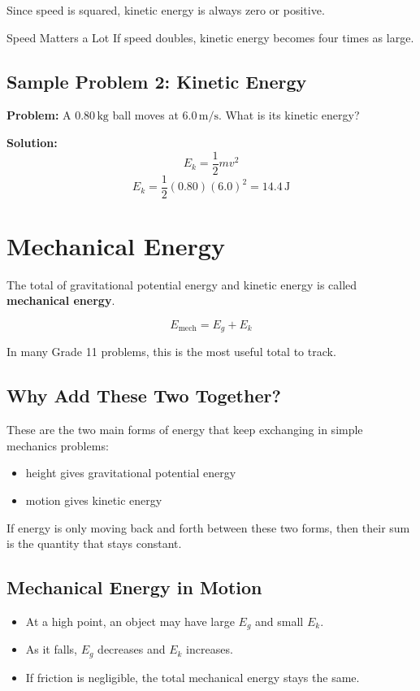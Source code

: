 Since speed is squared, kinetic energy is always zero or positive.

\begin{keyidea}{Speed Matters a Lot}
If speed doubles, kinetic energy becomes four times as large.
\end{keyidea}

\subsection*{Sample Problem 2: Kinetic Energy}
\textbf{Problem:} A $0.80\,\text{kg}$ ball moves at $6.0\,\text{m/s}$. What is its kinetic energy?

\textbf{Solution:}
\begin{equation*}
    E_k = \frac{1}{2}mv^2
\end{equation*}
\begin{equation*}
    E_k = \frac{1}{2}(0.80)(6.0)^2 = 14.4\,\text{J}
\end{equation*}

\section{Mechanical Energy}
The total of gravitational potential energy and kinetic energy is called \textbf{mechanical energy}.

\begin{equation}
    E_{\text{mech}} = E_g + E_k
\end{equation}

In many Grade 11 problems, this is the most useful total to track.

\subsection{Why Add These Two Together?}
These are the two main forms of energy that keep exchanging in simple mechanics problems:
\begin{itemize}
    \item height gives gravitational potential energy
    \item motion gives kinetic energy
\end{itemize}

If energy is only moving back and forth between these two forms, then their sum is the quantity that stays constant.

\subsection{Mechanical Energy in Motion}
\begin{itemize}
    \item At a high point, an object may have large $E_g$ and small $E_k$.
    \item As it falls, $E_g$ decreases and $E_k$ increases.
    \item If friction is negligible, the total mechanical energy stays the same.
\end{itemize}

